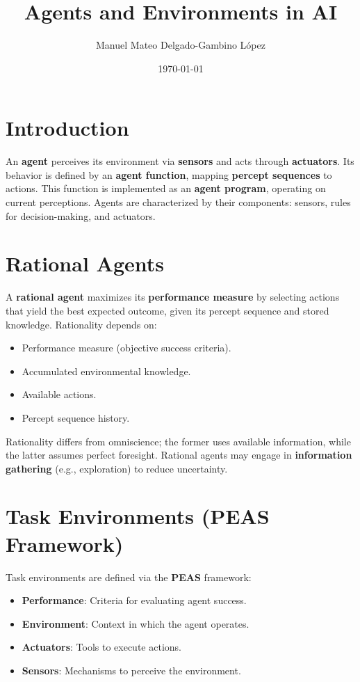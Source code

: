 \documentclass[conference]{IEEEtran}
\title{Agents and Environments in AI}
\author{Manuel Mateo Delgado-Gambino López}
\date{\today}
\begin{document}
\maketitle

\section{Introduction}
An \textbf{agent} perceives its environment via \textbf{sensors} and acts through \textbf{actuators}. Its behavior is defined by an \textbf{agent function}, mapping \textbf{percept sequences} to actions. This function is implemented as an \textbf{agent program}, operating on current perceptions. Agents are characterized by their components: sensors, rules for decision-making, and actuators.

\section{Rational Agents}
A \textbf{rational agent} maximizes its \textbf{performance measure} by selecting actions that yield the best expected outcome, given its percept sequence and stored knowledge. Rationality depends on:
\begin{itemize}
    \item Performance measure (objective success criteria).
    \item Accumulated environmental knowledge.
    \item Available actions.
    \item Percept sequence history.
\end{itemize}
Rationality differs from omniscience; the former uses available information, while the latter assumes perfect foresight. Rational agents may engage in \textbf{information gathering} (e.g., exploration) to reduce uncertainty.

\section{Task Environments (PEAS Framework)}
Task environments are defined via the \textbf{PEAS} framework:
\begin{itemize}
    \item \textbf{Performance}: Criteria for evaluating agent success.
    \item \textbf{Environment}: Context in which the agent operates.
    \item \textbf{Actuators}: Tools to execute actions.
    \item \textbf{Sensors}: Mechanisms to perceive the environment.
\end{itemize}
\end{document}
